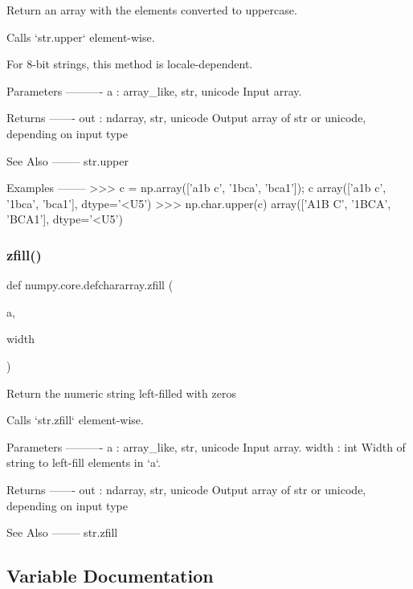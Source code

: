 \begin{DoxyVerb}Return an array with the elements converted to uppercase.

Calls `str.upper` element-wise.

For 8-bit strings, this method is locale-dependent.

Parameters
----------
a : array_like, {str, unicode}
    Input array.

Returns
-------
out : ndarray, {str, unicode}
    Output array of str or unicode, depending on input type

See Also
--------
str.upper

Examples
--------
>>> c = np.array(['a1b c', '1bca', 'bca1']); c
array(['a1b c', '1bca', 'bca1'], dtype='<U5')
>>> np.char.upper(c)
array(['A1B C', '1BCA', 'BCA1'], dtype='<U5')\end{DoxyVerb}
 \mbox{\label{namespacenumpy_1_1core_1_1defchararray_aa2c9a3e98b7b09a6faf12b574cf4c51b}} 
\subsubsection{\texorpdfstring{zfill()}{zfill()}}
{\footnotesize\ttfamily def numpy.\+core.\+defchararray.\+zfill (\begin{DoxyParamCaption}\item[{}]{a,  }\item[{}]{width }\end{DoxyParamCaption})}

\begin{DoxyVerb}Return the numeric string left-filled with zeros

Calls `str.zfill` element-wise.

Parameters
----------
a : array_like, {str, unicode}
    Input array.
width : int
    Width of string to left-fill elements in `a`.

Returns
-------
out : ndarray, {str, unicode}
    Output array of str or unicode, depending on input type

See Also
--------
str.zfill\end{DoxyVerb}
 

\subsection{Variable Documentation}
\mbox{\label{namespacenumpy_1_1core_1_1defchararray_a5a8ca69eff1bb8fd8193d470d49483f2}} 

